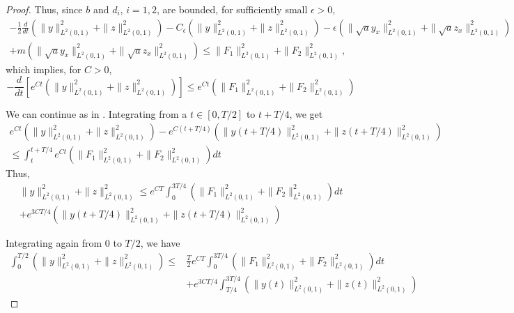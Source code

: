 \documentclass[11pt,oneside,a4papper]{osajnl}
\begin{document}
\begin{proof}
Thus, since $b$ and $d_i$, $i=1,2$, are bounded, for sufficiently small $\epsilon>0$, 
\begin{multline}\label{ecsiste3102}
    -\frac{1}{2}\frac{d}{dt}\left(\|y\|^2_{L^2(0,1)}+\|z\|^2_{L^2(0,1)}\right)-C_\epsilon\left(\|y\|^2_{L^2(0,1)}+\|z\|^2_{L^2(0,1)}\right) - \epsilon \left(\|\sqrt{a}y_x\|^2_{L^2(0,1)}+\|\sqrt{a}z_x\|^2_{L^2(0,1)}\right) \\    + m\left(\|\sqrt{a}y_x\|^2_{L^2(0,1)}+\|\sqrt{a}z_x\|^2_{L^2(0,1)}\right) \leq \|F_1\|^2_{L^2(0,1)}+\|F_2\|^2_{L^2(0,1)}, 
\end{multline}
which implies, for $C>0$, 
$$-\frac{d}{dt}\left[e^{Ct}\left(\|y\|^2_{L^2(0,1)}+\|z\|^2_{L^2(0,1)}\right)\right]\leq e^{Ct}\left(\|F_1\|^2_{L^2(0,1)}+\|F_2\|^2_{L^2(0,1)}\right)$$

We can continue as in \cite{DemarqueLimacoViana_deg_sys2020}.
Integrating from a $t\in [0,T/2]$ to $t+T/4$, we get
\begin{multline*}
    e^{Ct}\left(\|y\|^2_{L^2(0,1)}+\|z\|^2_{L^2(0,1)}\right)-e^{C(t+T/4)}\left(\|y(t+T/4)\|^2_{L^2(0,1)}+\|z(t+T/4)\|^2_{L^2(0,1)}\right)\\ \leq\int_{t}^{t+T/4} e^{Ct}\left(\|F_1\|^2_{L^2(0,1)}+\|F_2\|^2_{L^2(0,1)}\right)dt 
\end{multline*}
Thus, 
\begin{multline*}
\|y\|^2_{L^2(0,1)}+\|z\|^2_{L^2(0,1)} \leq e^{CT}\int_{0}^{3T/4} \left(\|F_1\|^2_{L^2(0,1)}+\|F_2\|^2_{L^2(0,1)}\right)dt\\
 +e^{3CT/4}\left(\|y(t+T/4)\|^2_{L^2(0,1)}+\|z(t+T/4)\|^2_{L^2(0,1)}\right)
\end{multline*}

Integrating again from 0 to $T/2$, we have	
\begin{equation}\label{ecsis3112}
\begin{split}
\int_{0}^{T/2}\left(\|y\|^2_{L^2(0,1)}+\|z\|^2_{L^2(0,1)}\right) %
\leq& \frac{T}{2}e^{CT}\int_{0}^{3T/4} \left(\|F_1\|^2_{L^2(0,1)}+\|F_2\|^2_{L^2(0,1)}\right)dt\\
&+e^{3CT/4}\int_{T/4}^{3T/4}\left(\|y(t)\|^2_{L^2(0,1)}+\|z(t)\|^2_{L^2(0,1)}\right)
\end{split}
\end{equation}


\end{proof}
\end{document}
